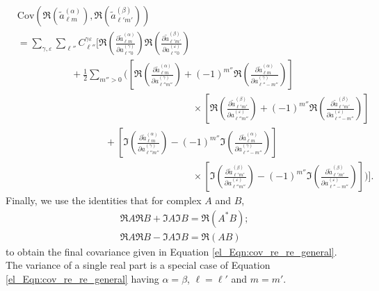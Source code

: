 \begin{equation}
\begin{split}
&
\mathrm{Cov} \left(
\Re \left( \widetilde{a}_{\ell m}^{ \left( \alpha \right) } \right),
\Re \left( \widetilde{a}_{\ell' m'}^{ \left( \beta \right) } \right)
\right) \\
&= \sum_{\gamma, \varepsilon}
\sum_{\ell''}
C_{\ell''}^{\gamma \varepsilon}
\Bigg[
\Re \left(
\frac{\partial \widetilde{a}_{\ell m}^{ \left( \alpha \right) }}
{\partial a_{\ell'' 0}^{ \left( \gamma \right) }}
\right)
\Re \left(
\frac{\partial \widetilde{a}_{\ell' m'}^{ \left( \beta \right) }}
{\partial a_{\ell'' 0}^{ \left( \varepsilon \right) }}
\right)
\\
&~~~~~~~~~~~~~~~~~~~~~~~~~ +
\frac{1}{2}
\sum_{m'' > 0} \Bigg(
\left[
\Re \left(
\frac{\partial \widetilde{a}_{\ell m}^{ \left( \alpha \right) }}
{\partial a_{\ell'' m''}^{ \left( \gamma \right) }}
\right)
+ \left( -1 \right)^{m''}
\Re \left(
\frac{\partial \widetilde{a}_{\ell m}^{ \left( \alpha \right) }}
{\partial a_{\ell'' -m''}^{ \left( \gamma \right) }}
\right) \right] \\
& \qquad\qquad\qquad\qquad\qquad\qquad\qquad\qquad\qquad \times
\left[
\Re \left(
\frac{\partial \widetilde{a}_{\ell' m'}^{ \left( \beta \right) }}
{\partial a_{\ell'' m''}^{ \left( \varepsilon \right) }}
\right)
+ \left( -1 \right)^{m''}
\Re \left(
\frac{\partial \widetilde{a}_{\ell' m'}^{ \left( \beta \right) }}
{\partial a_{\ell'' -m''}^{ \left( \varepsilon \right) }}
\right) \right] \\
&~~~~~~~~~~~~~~~~~~~~~~~~~~~~~~~~~~~~~~~~\, +
\left[ \Im \left(
\frac{\partial \widetilde{a}_{\ell m}^{ \left( \alpha \right) }}
{\partial a_{\ell'' m''}^{ \left( \gamma \right) }}
\right)
- \left( -1 \right)^{m''}
\Im \left(
\frac{\partial \widetilde{a}_{\ell m}^{ \left( \alpha \right) }}
{\partial a_{\ell'' -m''}^{ \left( \gamma \right) }}
\right) \right] \\
& \qquad\qquad\qquad\qquad\qquad\qquad\qquad\qquad\qquad \times
\left[ \Im \left(
\frac{\partial \widetilde{a}_{\ell' m'}^{ \left( \beta \right) }}
{\partial a_{\ell'' m''}^{ \left( \varepsilon \right) }}
\right)
- \left( -1 \right)^{m''}
\Im \left(
\frac{\partial \widetilde{a}_{\ell' m'}^{ \left( \beta \right) }}
{\partial a_{\ell'' -m''}^{ \left( \varepsilon \right) }}
\right) \right]
\Bigg) \Bigg].
\end{split}
\end{equation}
Finally, we use the identities that for complex $A$ and $B$,
\begin{align}
&\Re A \Re B + \Im A \Im B = \Re \left( A^* B \right); \\
&\Re A \Re B - \Im A \Im B = \Re \left( A B \right)
\end{align}
to obtain the final covariance given in Equation \eqref{el_Eqn:cov_re_re_general}. The variance of a single real part is a special case of Equation \eqref{el_Eqn:cov_re_re_general} having $\alpha = \beta$, $\ell = \ell'$ and $m = m'$.


